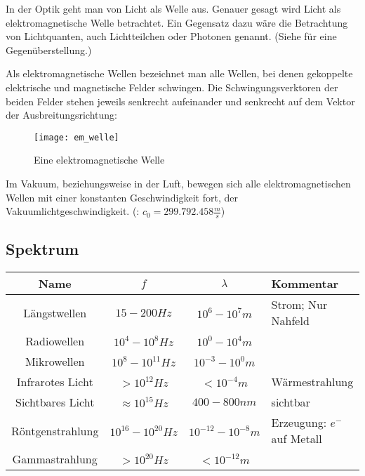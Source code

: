 In der Optik geht man von Licht als Welle aus. Genauer gesagt wird Licht als elektromagnetische Welle betrachtet. Ein Gegensatz dazu wäre die Betrachtung von Lichtquanten, auch Lichtteilchen oder Photonen genannt. (Siehe  für eine Gegenüberstellung.)

Als elektromagnetische Wellen bezeichnet man alle Wellen, bei denen gekoppelte elektrische und magnetische Felder schwingen. Die Schwingungsverktoren der beiden Felder stehen jeweils senkrecht aufeinander und senkrecht auf dem Vektor der Ausbreitungsrichtung:

\begin{figure}[h!]
	\center
	\texttt{[image: em\_welle]}
	\caption{Eine elektromagnetische Welle}
	\label{fig:emwelle}
\end{figure}

Im Vakuum, beziehungsweise in der Luft, bewegen sich alle elektromagnetischen Wellen mit einer konstanten Geschwindigkeit fort, der Vakuumlichtgeschwindigkeit. (: $c_0=299.792.458 \frac{m}{s}$)

\subsection{Spektrum}

\hspace{-17pt}
\begin{tabular}[c]{|c|c|c|l|}
	\hline
	Name				&	$f$						& $\lambda$ 	& Kommentar\\
	\hline
	Längstwellen		&	$15-200Hz$				& $10^6-10^7m$ & Strom; Nur Nahfeld\\
	Radiowellen			&	$10^4-10^8Hz$			& $10^0-10^4m$ & \\
	Mikrowellen			&	$10^8-10^{11}Hz$		& $10^{-3}-10^{0}m$ & \\
	Infrarotes Licht	&	$>10^{12}Hz$			& $<10^{-4}m$ & \glqq Wärmestrahlung\grqq \\
	Sichtbares Licht	&	$\approx 10^{15}Hz$		& $400-800nm$ & sichtbar\\
	Röntgenstrahlung	&	$10^{16} - 10^{20}Hz$	& $10^{-12}-10^{-8}m$ & Erzeugung: $e^{-}$ auf Metall \\
	Gammastrahlung		&	$>10^{20}Hz$			& $<10^{-12}m$ & \\
	\hline
\end{tabular}
